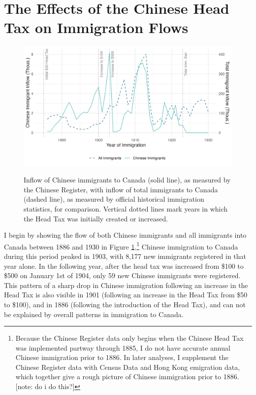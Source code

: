 
\section{The Effects of the Chinese Head Tax on Immigration Flows}




\begin{figure}[h!]
    \centering 
    \caption{Inflow of Chinese immigrants to Canada (solid line), as measured by the Chinese Register, with inflow of total immigrants to Canada (dashed line), as measured by official historical immigration statistics, for comparison. Vertical dotted lines mark years in which the Head Tax was initially created or increased.}
    \includegraphics[width=\textwidth]{../../figs/fig2_flow.png}
    \label{fig:inflow}
\end{figure}

I begin by showing the flow of both Chinese immigrants and all immigrants into Canada between 1886 and 1930 in Figure \ref{fig:inflow}.\footnote{Because the Chinese Register data only begins when the Chinese Head Tax was implemented partway through 1885, I do not have accurate annual Chinese immigration prior to 1886. In later analyses, I supplement the Chinese Register data with Census Data and Hong Kong emigration data, which together give a rough picture of Chinese immigration prior to 1886. [note: do i do this?]} 
Chinese immigration to Canada during this period peaked in 1903, with 8,177 new immigrants registered in that year alone. In the following year, after the head tax was increased from \$100 to \$500 on January 1st of 1904, only 59 new Chinese immigrants were registered. This pattern of a sharp drop in Chinese immigration following an increase in the Head Tax is also visible in 1901 (following an increase in the Head Tax from \$50 to \$100), and in 1886 (following the introduction of the Head Tax), and can not be explained by overall patterns in immigration to Canada.

